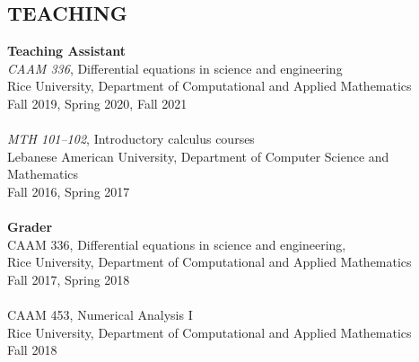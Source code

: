 \documentclass[margin]{res}
\begin{document}
\begin{resume}

\section{TEACHING}
\par
\textbf{Teaching Assistant}
\\ \textit{CAAM 336},  Differential equations in science and engineering \\ 
Rice University, Department of Computational and Applied Mathematics  \\ 
Fall 2019, Spring 2020, Fall 2021  \\ 
\\  \textit{MTH 101--102}, Introductory calculus courses\\ Lebanese American University,  Department of Computer Science and Mathematics \\ 
Fall 2016, Spring 2017 \\  \\ 
\textbf{Grader} 
\\ CAAM 336,   Differential equations in science and engineering, \\ 
Rice University, Department of Computational and Applied Mathematics  \\ 
 Fall 2017, Spring 2018 \\  \\ 
 CAAM 453, Numerical Analysis I \\
 Rice University, Department of Computational and Applied Mathematics  \\ 
  Fall 2018

\end{resume}
\end{document}
